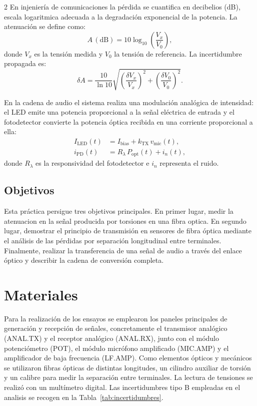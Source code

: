 \documentclass[12pt,a4paper]{article}
\begin{document}
\begin{multicols}{2}
En injeniería de comunicaciones la pérdida se cuantifica en decibelios (dB), escala logaritmica adecuada a la degradación exponencial de la potencia. La atenuación se define como:
\begin{equation}
A\,(\mathrm{dB}) = 10\log_{10}\!\left(\frac{V_x}{V_0}\right),
\label{eq:atenuacion}
\end{equation}
donde $V_x$ es la tensión medida y $V_0$ la tensión de referencia. La incertidumbre propagada es:
\begin{equation}
\delta A = \frac{10}{\ln 10}\sqrt{\left(\frac{\delta V_x}{V_x}\right)^2+\left(\frac{\delta V_0}{V_0}\right)^2}.
\label{eq:deltaA}
\end{equation}

En la cadena de audio el sistema realiza una modulación analógica de intensidad: el LED emite una potencia proporcional a la señal eléctrica de entrada y el fotodetector convierte la potencia óptica recibida en una corriente proporcional a ella:
\begin{align}
I_{\mathrm{LED}}(t) &= I_{\mathrm{bias}} + k_{\mathrm{TX}}\,v_{\mathrm{mic}}(t),\\
i_{\mathrm{PD}}(t)  &= R_{\lambda}\,P_{\mathrm{opt}}(t) + i_n(t),
\end{align}
donde $R_{\lambda}$ es la responsividad del fotodetector e $i_n$ representa el ruido.

\subsection{Objetivos}

Esta práctica persigue tres objetivos principales. En primer lugar, medir la atenuacion en la señal producida por torsiones en una fibra optica. En segundo lugar, demostrar el principio de transmisión en sensores de fibra óptica mediante el análisis de las pérdidas por separación longitudinal entre terminales. Finalmente, realizar la transferencia de una señal de audio a través del enlace óptico y describir la cadena de conversión completa.

\section{Materiales}

Para la realización de los ensayos se emplearon los paneles principales de generación y recepción de señales, concretamente el transmisor analógico (ANAL.TX) y el receptor analógico (ANAL.RX), junto con el módulo potenciómetro (POT), el módulo micrófono amplificado (MIC.AMP) y el amplificador de baja frecuencia (LF.AMP). Como elementos ópticos y mecánicos se utilizaron fibras ópticas de distintas longitudes, un cilindro auxiliar de torsión y un calibre para medir la separación entre terminales. La lectura de tensiones se realizó con un multímetro digital. Las incertidumbres tipo B empleadas en el analisis se recogen en la Tabla~\ref{tab:incertidumbres}.


\end{multicols}
\end{document}
